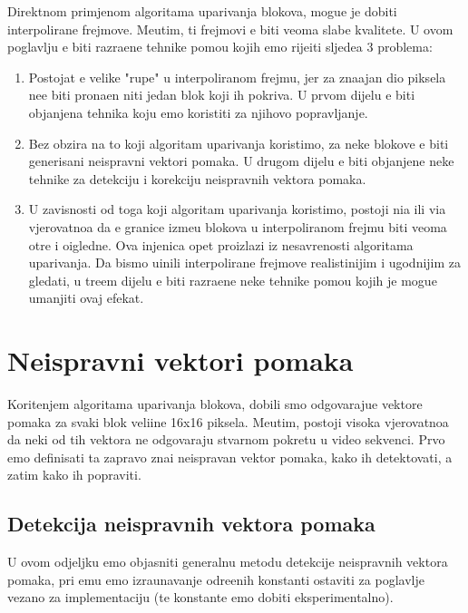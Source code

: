 Direktnom primjenom algoritama uparivanja blokova, mogu\cj e je dobiti interpolirane frejmove. Me\dj utim, ti frejmovi \cj e biti veoma slabe kvalitete. U ovom poglavlju \cj e biti razra\dj ene tehnike pomo\cj u kojih
\cj emo rije\sh iti sljede\cj a 3 problema:
\begin{enumerate}
	\item Postojat \cj e velike "rupe" u interpoliranom frejmu, jer za zna\ch ajan dio piksela ne\cj e biti prona\dj en niti jedan blok koji ih pokriva. U prvom dijelu \cj e biti obja\sh njena tehnika koju \cj emo koristiti
	za njihovo popravljanje.
	\item Bez obzira na to koji algoritam uparivanja koristimo, za neke blokove \cj e biti generisani neispravni vektori pomaka. U drugom dijelu \cj e biti obja\sh njene neke tehnike za detekciju i korekciju
	neispravnih vektora pomaka.
	\item U zavisnosti od toga koji algoritam uparivanja koristimo, postoji ni\zh a ili vi\sh a vjerovatno\cj a da \cj e granice izme\dj u blokova u interpoliranom frejmu biti veoma o\sh tre i o\ch igledne. Ova 
	\ch injenica opet proizlazi iz nesavr\sh enosti algoritama uparivanja. Da bismo u\ch inili interpolirane frejmove realisti\ch nijim i ugodnijim za gledati, u tre\cj em dijelu \cj e biti razra\dj ene neke tehnike pomo\cj u kojih je
	mogu\cj e umanjiti ovaj efekat.
\end{enumerate}

\section{Neispravni vektori pomaka}
Kori\sh tenjem algoritama uparivanja blokova, dobili smo odgovaraju\cj e vektore pomaka za svaki blok veli\ch ine 16x16 piksela. Me\dj utim, postoji visoka vjerovatno\cj a da neki od tih vektora ne odgovaraju stvarnom pokretu
u video sekvenci. Prvo \cj emo definisati \sh ta zapravo zna\ch i neispravan vektor pomaka, kako ih detektovati, a zatim kako ih popraviti. %

\subsection{Detekcija neispravnih vektora pomaka} %
U ovom odjeljku \cj emo objasniti generalnu metodu detekcije neispravnih vektora pomaka, pri \ch emu \cj emo izra\ch unavanje odre\dj enih konstanti ostaviti za poglavlje vezano za implementaciju (te konstante \cj emo dobiti
eksperimentalno)\cite{lowcomplexity}.

